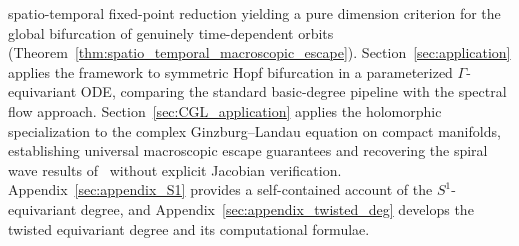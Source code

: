 \documentclass[twoside,11pt]{article}
\begin{document}
spatio-temporal fixed-point reduction yielding a pure dimension criterion for the global bifurcation of genuinely time-dependent orbits 
(Theorem~\ref{thm:spatio_temporal_macroscopic_escape}).
%
Section~\ref{sec:application} applies the framework to symmetric Hopf bifurcation in a parameterized $\Gamma$-equivariant ODE, comparing the standard basic-degree pipeline with the spectral flow approach.
%
Section~\ref{sec:CGL_application} applies the holomorphic specialization to the complex Ginzburg--Landau equation on compact manifolds, establishing universal macroscopic escape 
guarantees and recovering the spiral wave results of~\cite{GGK_NODEA} without explicit Jacobian verification.
%
Appendix~\ref{sec:appendix_S1} provides a self-contained account of the $S^1$-equivariant degree, and Appendix~\ref{sec:appendix_twisted_deg} develops the twisted equivariant degree and its computational formulae.
\end{document}

